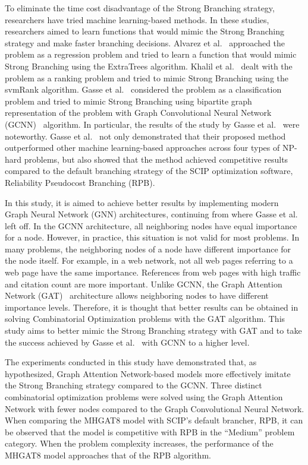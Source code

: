 To eliminate the time cost disadvantage of the Strong Branching strategy, researchers have tried machine learning-based methods.
In these studies, researchers aimed to learn functions that would mimic the Strong Branching strategy and make faster branching decisions.
Alvarez et al.~\cite{alvarezMachineLearningBasedApproximation2017} approached the problem as a regression problem and tried to learn a function that would mimic Strong Branching using the ExtraTrees algorithm.
Khalil et al.~\cite{khalilLearningBranchMixed2016} dealt with the problem as a ranking problem and tried to mimic Strong Branching using the svmRank algorithm.
Gasse et al.~\cite{gasseExactCombinatorialOptimization2019} considered the problem as a classification problem and tried to mimic Strong Branching using bipartite graph representation of the problem with Graph Convolutional Neural Network (GCNN)~\cite{kipfSemiSupervisedClassificationGraph2017} algorithm.
In particular, the results of the study by Gasse et al.~\cite{gasseExactCombinatorialOptimization2019} were noteworthy.
Gasse et al.~\cite{gasseExactCombinatorialOptimization2019} not only demonstrated that their proposed method outperformed other machine learning-based approaches across four types of NP-hard problems, but also showed that the method achieved competitive results compared to the default branching strategy of the SCIP optimization software, Reliability Pseudocost Branching (RPB).

In this study, it is aimed to achieve better results by implementing modern Graph Neural Network (GNN) architectures, continuing from where Gasse et al.~\cite{gasseExactCombinatorialOptimization2019} left off.
In the GCNN architecture, all neighboring nodes have equal importance for a node.
However, in practice, this situation is not valid for most problems.
In many problems, the neighboring nodes of a node have different importance for the node itself.
For example, in a web network, not all web pages referring to a web page have the same importance.
References from web pages with high traffic and citation count are more important.
Unlike GCNN, the Graph Attention Network (GAT)~\cite{velickovicGraphAttentionNetworks2018} architecture allows neighboring nodes to have different importance levels.
Therefore, it is thought that better results can be obtained in solving Combinatorial Optimization problems with the GAT algorithm.
This study aims to better mimic the Strong Branching strategy with GAT and to take the success achieved by Gasse et al.~\cite{gasseExactCombinatorialOptimization2019} with GCNN to a higher level.

The experiments conducted in this study have demonstrated that, as hypothesized, Graph Attention Network-based models more effectively imitate the Strong Branching strategy compared to the GCNN.
Three distinct combinatorial optimization problems were solved using the Graph Attention Network with fewer nodes compared to the Graph Convolutional Neural Network.
When comparing the MHGAT8 model with SCIP’s default brancher, RPB, it can be observed that the model is competitive with RPB in the “Medium” problem category.
When the problem complexity increases, the performance of the MHGAT8 model approaches that of the RPB algorithm.